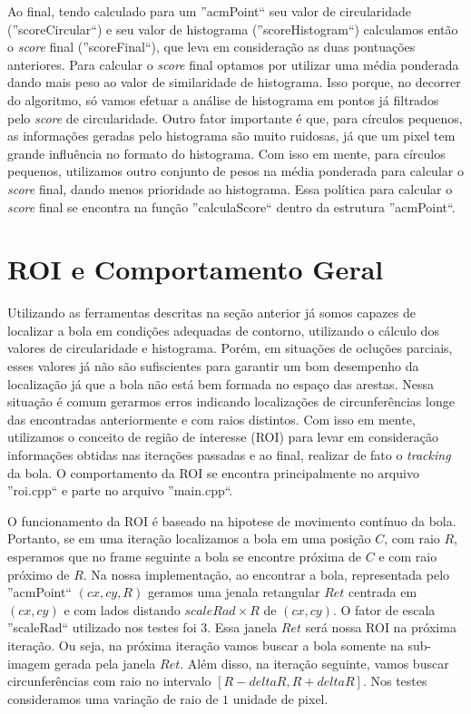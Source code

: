 \documentclass[11pt,a4paper]{article}
\begin{document}
 Ao final, tendo calculado para um ''acmPoint`` seu valor de circularidade (''scoreCircular``) e seu valor de histograma (''scoreHistogram``) calculamos então o \textit{score} final (''scoreFinal``), que leva em consideração as duas pontuações anteriores. Para calcular o \textit{score} final optamos por utilizar uma média ponderada dando mais peso ao valor de similaridade de histograma. Isso porque, no decorrer do algoritmo, só vamos efetuar a análise de histograma em pontos já filtrados pelo \textit{score} de circularidade. Outro fator importante é que, para círculos pequenos, as informações geradas pelo histograma são muito ruidosas, já que um pixel tem grande influência no formato do histograma. Com isso em mente, para círculos pequenos, utilizamos outro conjunto de pesos na média ponderada para calcular o \textit{score} final, dando menos prioridade ao histograma. Essa política para calcular o \textit{score} final se encontra na função ''calculaScore`` dentro da estrutura ''acmPoint``.

\section{ROI e Comportamento Geral}

 Utilizando as ferramentas descritas na seção anterior já somos capazes de localizar a bola em condições adequadas de contorno, utilizando o cálculo dos valores de circularidade e histograma. Porém, em situações de ocluções parciais, esses valores já não são sufiscientes para garantir um bom desempenho da localização já que a bola não está bem formada no espaço das arestas. Nessa situação é comum gerarmos erros indicando localizações de circunferências longe das encontradas anteriormente e com raios distintos. Com isso em mente, utilizamos o conceito de região de interesse (ROI) para levar em consideração informações obtidas nas iterações passadas e ao final, realizar de fato o \textit{tracking} da bola. O comportamento da ROI se encontra principalmente no arquivo ''roi.cpp`` e parte no arquivo ''main.cpp``.

 O funcionamento da ROI é baseado na hipotese de movimento contínuo da bola. Portanto, se em uma iteração localizamos a bola em uma posição $C$, com raio $R$, esperamos que no frame seguinte a bola se encontre próxima de $C$ e com raio próximo de $R$. Na nossa implementação, ao encontrar a bola, representada pelo ''acmPoint`` $(cx,cy,R)$ geramos uma jenala retangular $Ret$ centrada em $(cx,cy)$ e com lados distando $scaleRad\times R$ de $(cx,cy)$. O fator de escala ''scaleRad`` utilizado nos testes foi $3$. Essa janela $Ret$ será nossa ROI na próxima iteração. Ou seja, na próxima iteração vamos buscar a bola somente na sub-imagem gerada pela janela $Ret$. Além disso, na iteração seguinte, vamos buscar circunferências com raio no intervalo $[R-deltaR,R+deltaR]$. Nos testes consideramos uma variação de raio de $1$ unidade de pixel.
\end{document}
